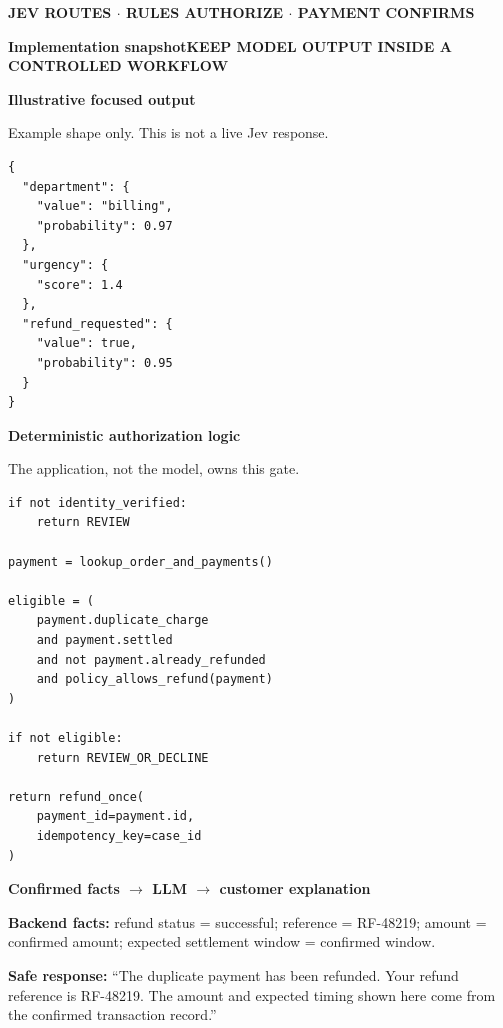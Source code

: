 \documentclass[10pt,a4paper,landscape]{article}
\newcommand{\pageheading}[2]{%
  {\Large\bfseries\color{Navy}#1}\hfill{\small\bfseries\color{Teal}#2}\par
  \vspace{1mm}{\color{Line}\rule{\textwidth}{0.7pt}}\vspace{3mm}
}
\begin{document}
\vspace{3mm}
\begin{tcolorbox}[clean,colback=Navy,coltext=white]
\centering
{\Large\bfseries JEV ROUTES \quad $\cdot$ \quad RULES AUTHORIZE \quad $\cdot$ \quad PAYMENT CONFIRMS}
\end{tcolorbox}

\newpage

\pageheading{Implementation snapshot}{KEEP MODEL OUTPUT INSIDE A CONTROLLED WORKFLOW}

\begin{minipage}[t]{0.48\textwidth}
{\large\bfseries\color{Navy} Illustrative focused output}\par
{\scriptsize\color{Muted}Example shape only. This is not a live Jev response.}
\begin{lstlisting}[style=netsetos]
{
  "department": {
    "value": "billing",
    "probability": 0.97
  },
  "urgency": {
    "score": 1.4
  },
  "refund_requested": {
    "value": true,
    "probability": 0.95
  }
}
\end{lstlisting}
\end{minipage}\hfill
\begin{minipage}[t]{0.48\textwidth}
{\large\bfseries\color{Navy} Deterministic authorization logic}\par
{\scriptsize\color{Muted}The application, not the model, owns this gate.}
\begin{lstlisting}[style=netsetos]
if not identity_verified:
    return REVIEW

payment = lookup_order_and_payments()

eligible = (
    payment.duplicate_charge
    and payment.settled
    and not payment.already_refunded
    and policy_allows_refund(payment)
)

if not eligible:
    return REVIEW_OR_DECLINE

return refund_once(
    payment_id=payment.id,
    idempotency_key=case_id
)
\end{lstlisting}
\end{minipage}

\vspace{4mm}
\begin{tcolorbox}[border,colback=PaleBlue]
{\large\bfseries\color{Blue} Confirmed facts $\rightarrow$ LLM $\rightarrow$ customer explanation}\par
\vspace{2mm}
\textbf{Backend facts:} refund status = successful; reference = RF-48219; amount = confirmed amount; expected settlement window = confirmed window.\par
\textbf{Safe response:} ``The duplicate payment has been refunded. Your refund reference is RF-48219. The amount and expected timing shown here come from the confirmed transaction record.''
\end{tcolorbox}
\end{document}
